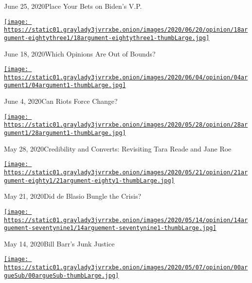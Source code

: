 June 25, 2020Place Your Bets on Biden's V.P.

\href{https://www.nytimes3xbfgragh.onion/2020/06/18/opinion/the-argument-tom-cotton-resignation.html?action=click\&module=audio-series-bar\&region=header\&pgtype=Article}{\texttt{[image: https://static01.graylady3jvrrxbe.onion/images/2020/06/20/opinion/18argument-eightythree1/18argument-eightythree1-thumbLarge.jpg]}}

June 18, 2020Which Opinions Are Out of Bounds?

\href{https://www.nytimes3xbfgragh.onion/2020/06/04/opinion/the-argument-protest-riot-violence.html?action=click\&module=audio-series-bar\&region=header\&pgtype=Article}{\texttt{[image: https://static01.graylady3jvrrxbe.onion/images/2020/06/04/opinion/04argument1/04argument1-thumbLarge.jpg]}}

June 4, 2020Can Riots Force Change?

\href{https://www.nytimes3xbfgragh.onion/2020/05/28/opinion/the-argument-tara-reade-norma-mccorvey.html?action=click\&module=audio-series-bar\&region=header\&pgtype=Article}{\texttt{[image: https://static01.graylady3jvrrxbe.onion/images/2020/05/28/opinion/28argument1/28argument1-thumbLarge.jpg]}}

May 28, 2020Credibility and Converts: Revisiting Tara Reade and Jane Roe

\href{https://www.nytimes3xbfgragh.onion/2020/05/21/opinion/the-argument-de-blasio-cuomo-coronavirus.html?action=click\&module=audio-series-bar\&region=header\&pgtype=Article}{\texttt{[image: https://static01.graylady3jvrrxbe.onion/images/2020/05/21/opinion/21argument-eighty1/21argument-eighty1-thumbLarge.jpg]}}

May 21, 2020Did de Blasio Bungle the Crisis?

\href{https://www.nytimes3xbfgragh.onion/2020/05/14/opinion/the-argument-flynn-barr-coronavirus.html?action=click\&module=audio-series-bar\&region=header\&pgtype=Article}{\texttt{[image: https://static01.graylady3jvrrxbe.onion/images/2020/05/14/opinion/14arguement-seventynine1/14arguement-seventynine1-thumbLarge.jpg]}}

May 14, 2020Bill Barr's Junk Justice

\href{https://www.nytimes3xbfgragh.onion/2020/05/07/opinion/justin-amash-trump-biden.html?action=click\&module=audio-series-bar\&region=header\&pgtype=Article}{\texttt{[image: https://static01.graylady3jvrrxbe.onion/images/2020/05/07/opinion/00argueSub/00argueSub-thumbLarge.jpg]}}

